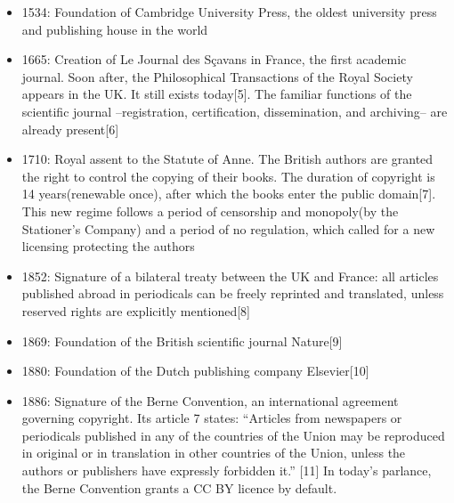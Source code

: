 \documentclass[10pt,compress,serif]{beamer}
\begin{document}
\begin{frame}[t]%
 \vskip1cm%

 \begin{itemize}
 \item 1534: Foundation of Cambridge University Press, the oldest university press and publishing house in the world
 \item 1665: Creation of Le Journal des Sçavans in France, the first academic journal. Soon after, the Philosophical Transactions of the Royal Society appears in the UK. It still exists today[5]. The familiar functions of the scientific journal –registration, certification, dissemination, and archiving– are already present[6]
 \item 1710: Royal assent to the Statute of Anne. The British authors are granted the right to control the copying of their books. The duration of copyright is 14 years(renewable once), after which the books enter the public domain[7]. This new regime follows a period of censorship and monopoly(by the Stationer’s Company) and a period of no regulation, which called for a new licensing protecting the authors
 \item 1852: Signature of a bilateral treaty between the UK and France: all articles published abroad in periodicals can be freely reprinted and translated, unless reserved rights are explicitly mentioned[8]
 \item 1869: Foundation of the British scientific journal Nature[9]
 \item 1880: Foundation of the Dutch publishing company Elsevier[10]
 \item 1886: Signature of the Berne Convention, an international agreement governing copyright. Its article 7 states: “Articles from newspapers or periodicals published
   in any of the countries of the Union may be reproduced in original or in translation in other countries of the Union, unless the authors or publishers have expressly forbidden it.” [11] In today’s parlance, the Berne Convention grants a CC BY licence by default.


\end{itemize}
\end{frame}
\end{document}

